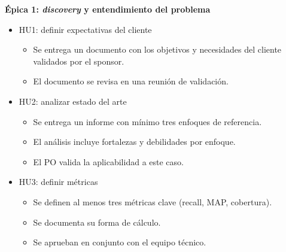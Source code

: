 \documentclass[
11pt, %
]{charter}
\begin{document}
\textbf{\'Epica 1: \textit{discovery} y entendimiento del problema}
\begin{itemize}
  \item HU1: definir expectativas del cliente
  \begin{itemize}
    \item Se entrega un documento con los objetivos y necesidades del cliente validados por el sponsor.
    \item El documento se revisa en una reunión de validación.
  \end{itemize}
  \item HU2: analizar estado del arte
  \begin{itemize}
    \item Se entrega un informe con mínimo tres enfoques de referencia.
    \item El análisis incluye fortalezas y debilidades por enfoque.
    \item El PO valida la aplicabilidad a este caso.
  \end{itemize}
  \item HU3: definir métricas
  \begin{itemize}
    \item Se definen al menos tres métricas clave (recall, MAP, cobertura).
    \item Se documenta su forma de cálculo.
    \item Se aprueban en conjunto con el equipo técnico.
  \end{itemize}
\end{itemize}
\end{document}
